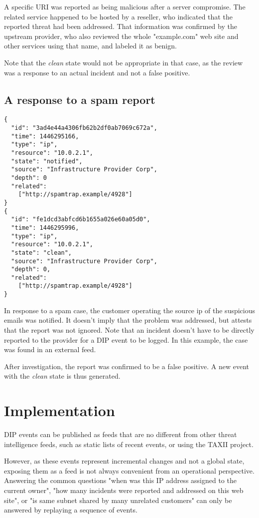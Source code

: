 \documentclass[conference]{IEEEtran}
\begin{document}
A specific URI was reported as being malicious after a server compromise. The related service happened to be hosted by a reseller, who indicated that the reported threat had been addressed. That information was confirmed by the upstream provider, who also reviewed the whole "example.com" web site and other services using that name, and labeled it as benign.

Note that the \emph{clean} state would not be appropriate in that case, as the review was a response to an actual incident and not a false positive.

\subsection{A response to a spam report}

\begin{verbatim}
{
  "id": "3ad4e44a4306fb62b2df0ab7069c672a",
  "time": 1446295166,
  "type": "ip",
  "resource": "10.0.2.1",
  "state": "notified",
  "source": "Infrastructure Provider Corp",
  "depth": 0
  "related":
    ["http://spamtrap.example/4928"]
}
{
  "id": "fe1dcd3abfcd6b1655a026e60a05d0",
  "time": 1446295996,
  "type": "ip",
  "resource": "10.0.2.1",
  "state": "clean",
  "source": "Infrastructure Provider Corp",
  "depth": 0,
  "related":
    ["http://spamtrap.example/4928"]
}	
\end{verbatim}

In response to a spam case, the customer operating the source ip of the suspicious emails was notified. It doesn't imply that the problem was addressed, but attests that the report was not ignored. Note that an incident doesn't have to be directly reported to the provider for a DIP event to be logged. In this example, the case was found in an external feed.

After investigation, the report was confirmed to be a false positive. A new event with the \emph{clean} state is thus generated.

\section{Implementation}

DIP events can be published as feeds that are no different from other threat intelligence feeds, such as static lists of recent events, or using the TAXII \cite{TAXII} project.

However, as these events represent incremental changes and not a global state, exposing them as a feed is not always convenient from an operational perspective. Answering the common questions "when was this IP address assigned to the current owner", "how many incidents were reported and addressed on this web site", or "is same subnet shared by many unrelated customers" can only be answered by replaying a sequence of events.
\end{document}
